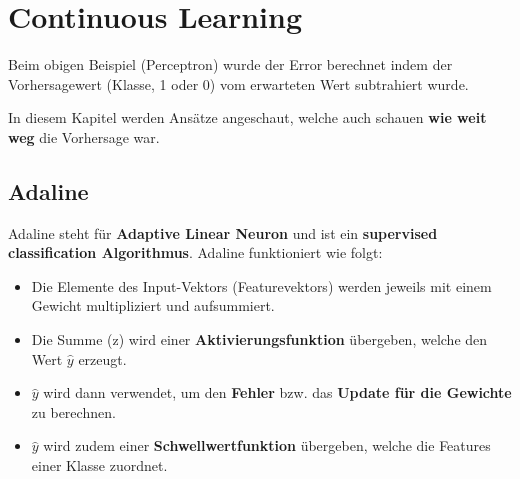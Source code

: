 \newpage
\section{Continuous Learning}
\label{sec:continuous_learning}

Beim obigen Beispiel (Perceptron) wurde der Error berechnet indem der Vorhersagewert (Klasse, 1 oder 0) vom erwarteten Wert subtrahiert wurde.

In diesem Kapitel werden Ansätze angeschaut, welche auch schauen \textbf{wie weit weg} die Vorhersage war.

\subsection{Adaline}

Adaline steht für \textbf{Adaptive Linear Neuron} und ist ein \textbf{supervised classification Algorithmus}. Adaline funktioniert wie folgt:

\begin{itemize}
  \item Die Elemente des Input-Vektors (Featurevektors) werden jeweils mit einem Gewicht multipliziert und aufsummiert.
  \item Die Summe (z) wird einer \textbf{Aktivierungsfunktion} übergeben, welche den Wert $\hat{y}$ erzeugt.
  \item $\hat{y}$ wird dann verwendet, um den \textbf{Fehler} bzw. das \textbf{Update für die Gewichte} zu berechnen.
  \item $\hat{y}$ wird zudem einer \textbf{Schwellwertfunktion} übergeben, welche die Features einer Klasse zuordnet.
\end{itemize}




\newcommand{\myThresholdFunction}{
\draw[thick] %
			 (-0.5em,1.25em) -- (-0.5em,-1.25em)
(-0.5em,1.25em) -- (0.5em,1.25em)
(-0.5em,-1.25em) -- (-1.5em,-1.25em)
;}


